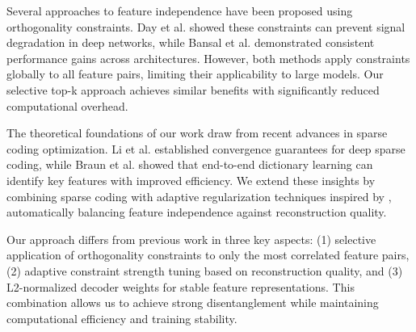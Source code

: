 \documentclass{article} %
\begin{document}
Several approaches to feature independence have been proposed using orthogonality constraints. Day et al. \cite{Day2023FeatureLA} showed these constraints can prevent signal degradation in deep networks, while Bansal et al. \cite{Bansal2018CanWG} demonstrated consistent performance gains across architectures. However, both methods apply constraints globally to all feature pairs, limiting their applicability to large models. Our selective top-k approach achieves similar benefits with significantly reduced computational overhead.

The theoretical foundations of our work draw from recent advances in sparse coding optimization. Li et al. \cite{Li2024ConvergenceAF} established convergence guarantees for deep sparse coding, while Braun et al. \cite{Braun2024IdentifyingFI} showed that end-to-end dictionary learning can identify key features with improved efficiency. We extend these insights by combining sparse coding with adaptive regularization techniques inspired by \cite{Cao2020HeteroskedasticAI}, automatically balancing feature independence against reconstruction quality.

Our approach differs from previous work in three key aspects: (1) selective application of orthogonality constraints to only the most correlated feature pairs, (2) adaptive constraint strength tuning based on reconstruction quality, and (3) L2-normalized decoder weights for stable feature representations. This combination allows us to achieve strong disentanglement while maintaining computational efficiency and training stability.




\end{document}
